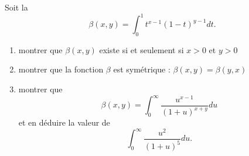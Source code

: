 

\begin{exercice}\label{exo_I-3-11}

Soit la 
\begin{equation}
	\beta(x,y)=\int_0^1t^{x-1}(1-t)^{y-1}dt.
\end{equation}
\begin{enumerate}
\item montrer que $\beta(x,y)$ existe si et seulement si $x>0$ et $y>0$
\item montrer que la fonction $\beta$ est symétrique : $\beta(x,y)=\beta(y,x)$
\item montrer que 
\begin{equation}
	\beta(x,y)=\int_0^{\infty}\frac{ u^{x-1} }{ (1+u)^{x+y} }du
\end{equation}
et en déduire la valeur de
\begin{equation}
	\int_0^{\infty}\frac{ u^2 }{ (1+u)^5 }du.
\end{equation}
\end{enumerate}


\end{exercice}
